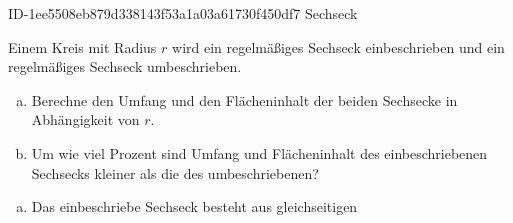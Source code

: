 \begin{exercise}
      {ID-1ee5508eb879d338143f53a1a03a61730f450df7}
      {Sechseck}
  \ifproblem\problem\par
    Einem Kreis mit Radius $r$ wird ein regelmäßiges Sechseck einbeschrieben und
    ein regelmäßiges Sechseck umbeschrieben.\par
    \begin{minipage}{0.35\textwidth}
      \centering
    \end{minipage}\hfill
    \begin{minipage}{0.64\textwidth}
      \begin{enumerate}[a)]
        \item Berechne den Umfang und den Flächeninhalt der beiden Sechsecke in
              Abhängigkeit von $r$.        \item Um wie viel Prozent sind Umfang und Flächeninhalt des einbeschriebenen
              Sechsecks kleiner als die des umbeschriebenen?
      \end{enumerate}
    \end{minipage}
  \fi
  \ifoutline\outline\par
    \begin{enumerate}[a)]
      \item Das einbeschriebe Sechseck besteht aus gleichseitigen

\end{enumerate}
\end{exercise}
